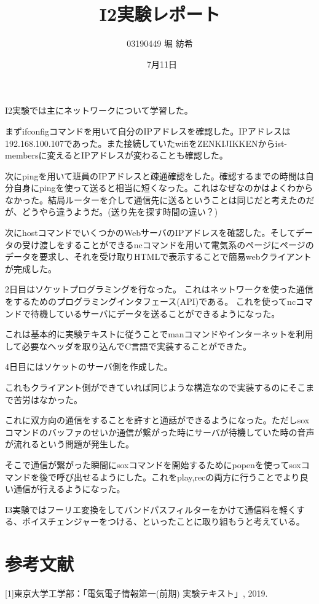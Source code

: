 \documentclass[dvipdfmx]{jsarticle}
\begin{document}
\title{I2実験レポート}
\author{03190449  堀 紡希}
\date{\ 7月11日}
\maketitle

I2実験では主にネットワークについて学習した。

まずifconfigコマンドを用いて自分のIPアドレスを確認した。IPアドレスは192.168.100.107であった。また接続していたwifiをZENKIJIKKENからist-membersに変えるとIPアドレスが変わることも確認した。

次にpingを用いて班員のIPアドレスと疎通確認をした。確認するまでの時間は自分自身にpingを使って送ると相当に短くなった。これはなぜなのかはよくわからなかった。結局ルーターを介して通信先に送るということは同じだと考えたのだが、どうやら違うようだ。(送り先を探す時間の違い？)

次にhostコマンドでいくつかのWebサーバのIPアドレスを確認した。そしてデータの受け渡しをすることができるncコマンドを用いて電気系のページにページのデータを要求し、それを受け取りHTMLで表示することで簡易webクライアントが完成した。

2日目はソケットプログラミングを行なった。
これはネットワークを使った通信をするためのプログラミングインタフェース(API)である。
これを使ってncコマンドで待機しているサーバにデータを送ることができるようになった。

これは基本的に実験テキストに従うことでmanコマンドやインターネットを利用して必要なヘッダを取り込んでC言語で実装することができた。

4日目にはソケットのサーバ側を作成した。

これもクライアント側ができていれば同じような構造なので実装するのにそこまで苦労はなかった。

これに双方向の通信をすることを許すと通話ができるようになった。ただしsoxコマンドのバッファのせいか通信が繋がった時にサーバが待機していた時の音声が流れるという問題が発生した。

そこで通信が繋がった瞬間にsoxコマンドを開始するためにpopenを使ってsoxコマンドを後で呼び出せるようにした。これをplay,recの両方に行うことでより良い通信が行えるようになった。

I3実験ではフーリエ変換をしてバンドパスフィルターをかけて通信料を軽くする、ボイスチェンジャーをつける、といったことに取り組もうと考えている。


\section{参考文献}
[1]東京大学工学部：「電気電子情報第一(前期) 実験テキスト」, 2019.
\end{document}
